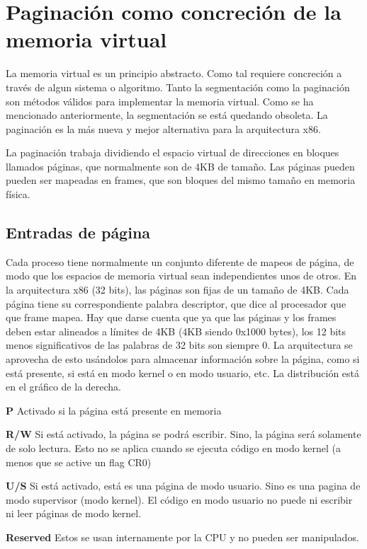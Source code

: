\documentclass{report}
\begin{document}
\section{Paginación como concreción de la memoria virtual}

La memoria virtual es un principio abstracto. Como tal requiere concreción a través de algun sistema o algoritmo. Tanto la segmentación como la paginación son métodos válidos para implementar la memoria virtual. Como se ha mencionado anteriormente, la segmentación se está quedando obsoleta. La paginación es la más nueva y mejor alternativa para la arquitectura x86.

La paginación trabaja dividiendo el espacio virtual de direcciones en bloques llamados páginas, que normalmente son de 4KB de tamaño. Las páginas pueden pueden ser mapeadas en frames, que son bloques del mismo tamaño en memoria física.


\subsection{Entradas de página}


Cada proceso tiene normalmente un conjunto diferente de mapeos de página, de modo que los espacios de memoria virtual sean independientes unos de otros. En la arquitectura x86 (32 bits), las páginas son fijas de un tamaño de 4KB. Cada página tiene su correspondiente palabra descriptor, que dice al procesador que que frame mapea. Hay que darse cuenta que ya que las páginas y los frames deben estar alineados a límites de 4KB (4KB siendo 0x1000 bytes), los 12 bits menos significativos de las palabras de 32 bits son siempre 0. La arquitectura se aprovecha de esto usándolos para almacenar información sobre la página, como si está presente, si está en modo kernel o en modo usuario, etc. La distribución está en el gráfico de la derecha.


\textbf{P}
    Activado si la página está presente en memoria

\textbf{R/W}
    Si está activado, la página se podrá escribir. Sino, la página será solamente de solo lectura. Esto no se aplica cuando se ejecuta código en modo kernel (a menos que se active un flag CR0)

\textbf{U/S}
    Si está activado, está es una página de modo usuario. Sino es una pagina de modo supervisor (modo kernel). El código en modo usuario no puede ni escribir ni leer páginas de modo kernel.

\textbf{Reserved}
    Estos se usan internamente por la CPU y no pueden ser manipulados.
\end{document}
